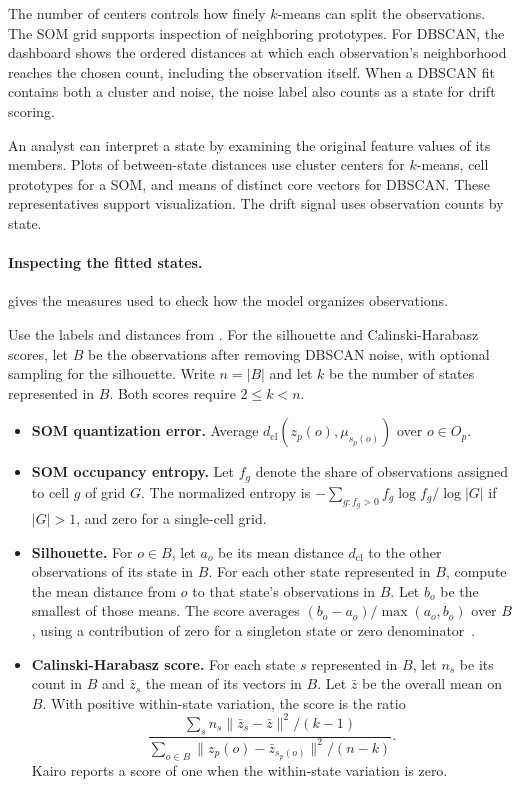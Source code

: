 The number of centers controls how finely $k$-means can split the observations. The SOM grid supports inspection of neighboring prototypes. For DBSCAN, the dashboard shows the ordered distances at which each observation's neighborhood reaches the chosen count, including the observation itself. When a DBSCAN fit contains both a cluster and noise, the noise label also counts as a state for drift scoring.



An analyst can interpret a state by examining the original feature values of its members. Plots of between-state distances use cluster centers for $k$-means, cell prototypes for a SOM, and means of distinct core vectors for DBSCAN. These representatives support visualization. The drift signal uses observation counts by state.

\paragraph{Inspecting the fitted states.}
 gives the measures used to check how the model organizes observations.

\begin{Definition}\label{def:cluster-diagnostics}
Use the labels and distances from . For the silhouette and Calinski-Harabasz scores, let $B$ be the observations after removing DBSCAN noise, with optional sampling for the silhouette. Write $n=|B|$ and let $k$ be the number of states represented in $B$. Both scores require $2\leq k<n$.
\begin{itemize}
  \item \textbf{SOM quantization error.} Average $d_{\mathrm{cl}}(z_p(o),\mu_{s_p(o)})$ over $o\in O_p$.
  \item \textbf{SOM occupancy entropy.} Let $f_g$ denote the share of observations assigned to cell $g$ of grid $G$. The normalized entropy is $-\sum_{g:f_g>0}f_g\log f_g/\log|G|$ if $|G|>1$, and zero for a single-cell grid.
  \item \textbf{Silhouette.} For $o\in B$, let $a_o$ be its mean distance $d_{\mathrm{cl}}$ to the other observations of its state in $B$. For each other state represented in $B$, compute the mean distance from $o$ to that state's observations in $B$. Let $b_o$ be the smallest of those means. The score averages $(b_o-a_o)/\max(a_o,b_o)$ over $B$, using a contribution of zero for a singleton state or zero denominator~\cite{rousseeuw1987silhouettes}.
  \item \textbf{Calinski-Harabasz score.} For each state $s$ represented in $B$, let $n_s$ be its count in $B$ and $\bar z_s$ the mean of its vectors in $B$. Let $\bar z$ be the overall mean on $B$. With positive within-state variation, the score is the ratio~\cite{calinski1974dendrite}
  \[
     \frac{\sum_s n_s\|\bar z_s-\bar z\|^2/(k-1)}
          {\sum_{o\in B}\|z_p(o)-\bar z_{s_p(o)}\|^2/(n-k)}.
  \]
  Kairo reports a score of one when the within-state variation is zero.
\end{itemize}
\end{Definition}

